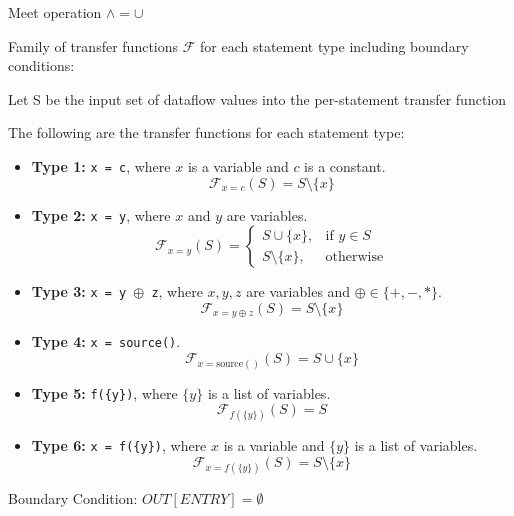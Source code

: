\documentclass[12pt]{article}
\begin{document}
\begin{enumerate}
\begin{mdframed}
        Meet operation $\wedge = \cup $

        Family of transfer functions $\mathcal{F}$ for each statement type
        including boundary conditions:

        Let S be the input set of dataflow values into the per-statement transfer function

        The following are the transfer functions for each statement type:

        \begin{itemize}

            \item \textbf{Type 1:} \texttt{x = c}, where $x$ is a variable and $c$ is a constant.
            \[
                \mathcal{F}_{x = c}(S) = S \setminus \{x\}
            \]

            \item \textbf{Type 2:} \texttt{x = y}, where $x$ and $y$ are variables.
            \[
                \mathcal{F}_{x = y}(S) =
                \begin{cases}
                    S \cup \{x\}, & \text{if } y \in S \\
                    S \setminus \{x\}, & \text{otherwise}
                \end{cases}
            \]

            \item \textbf{Type 3:} \texttt{x = y $\oplus$ z}, where $x, y, z$ are variables and $\oplus \in \{+, -, *\}$.
            \[
                \mathcal{F}_{x = y \oplus z}(S) = S \setminus \{x\}
            \]

            \item \textbf{Type 4:} \texttt{x = source()}.
            \[
                \mathcal{F}_{x = \text{source}()}(S) = S \cup \{x\}
            \]

            \item \textbf{Type 5:} \texttt{f(\{y\})}, where $\{y\}$ is a list of variables.
            \[
                \mathcal{F}_{f(\{y\})}(S) = S
            \]

            \item \textbf{Type 6:} \texttt{x = f(\{y\})}, where $x$ is a variable and $\{y\}$ is a list of variables.
            \[
                \mathcal{F}_{x = f(\{y\})}(S) = S \setminus \{x\}
            \]


        \end{itemize}
    
        Boundary Condition: $OUT[ENTRY] = \emptyset$


\end{mdframed}
\end{enumerate}
\end{document}
